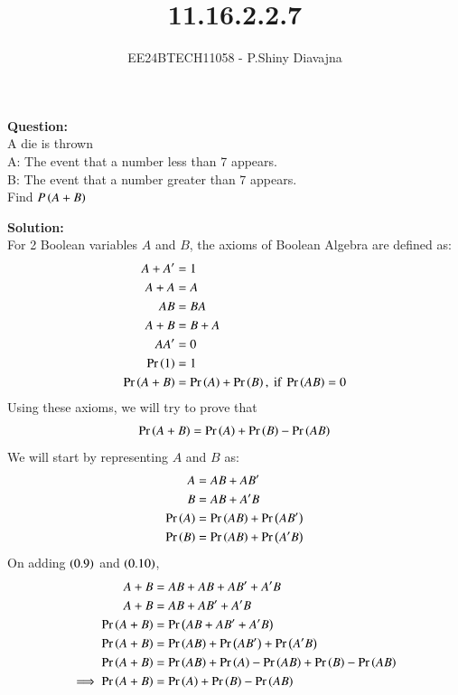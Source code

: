\documentclass[journal]{IEEEtran}
\begin{document}

\vspace{3cm}

\title{11.16.2.2.7}
\author{EE24BTECH11058 - P.Shiny Diavajna}
{\let\newpage\relax\maketitle}

\renewcommand{\thefigure}{\theenumi}
\renewcommand{\thetable}{\theenumi}
\setlength{\intextsep}{10pt} %


\renewcommand{\thetable}{\theenumi}
\textbf{Question:}\\
A die is thrown\\
A: The event that a number less than 7 appears.\\
B: The event that a number greater than 7 appears.\\
Find $P\left(A+B\right)$


\textbf{Solution:}\\
For 2 Boolean variables $A$ and $B$, the axioms of Boolean Algebra are defined as:
\begin{align}
	A + A^\prime &= 1\\
	A + A &= A\\
	AB &= BA\\
	A + B &= B + A\\
	AA^\prime &= 0\\
	\Pr\left(1\right) &= 1\\
	\Pr\left(A + B\right) &= \Pr\left(A\right) + \Pr\left(B\right), \text{ if } \Pr\left(AB\right) = 0
\end{align}
Using these axioms, we will try to prove that
\begin{align}
	\Pr\left(A + B\right) = \Pr\left(A\right) + \Pr\left(B\right) - \Pr\left(AB\right)
\end{align}
We will start by representing $A$ and $B$ as:
\begin{align}
	A &= AB + AB^\prime\\
	B &= AB + A^\prime B\\
	\Pr\left(A\right) &= \Pr\left(AB\right) + \Pr\left(AB^\prime\right)\\
	\Pr\left(B\right) &= \Pr\left(AB\right) + \Pr\left(A^\prime B\right)
\end{align}
On adding $\left(0.9\right)$ and $\left(0.10\right)$,
\begin{align}
	A + B &= AB + AB + AB^\prime + A^\prime B\\
	A + B &= AB + AB^\prime + A^\prime B\\
	\Pr\left(A + B\right) &= \Pr\left(AB + AB^\prime + A^\prime B\right)\\
	\Pr\left(A + B\right) &= \Pr\left(AB\right) + \Pr\left(AB^\prime\right) + \Pr\left(A^\prime B\right)\\
	\Pr\left(A + B\right) &= \Pr\left(AB\right) + \Pr\left(A\right) - \Pr\left(AB\right) + \Pr\left(B\right) - \Pr\left(AB\right)\\
	\implies \Pr\left(A + B\right) &= \Pr\left(A\right) + \Pr\left(B\right) - \Pr\left(AB\right)
\end{align}
\end{document}
